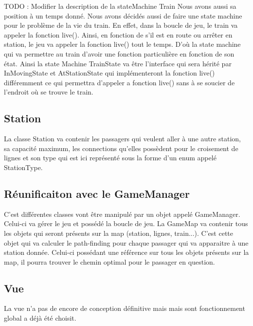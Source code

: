 \documentclass[report, backcover, french, nodocumentinfo]{upmethodology-document}
\begin{document}
			TODO : Modifier la description de la stateMachine Train
			Nous avons aussi sa position à un temps donné. Nous avons décidés aussi de faire une state machine pour le problème de la vie du train. En effet, dans la boucle de jeu, le train va appeler la fonction live(). Ainsi, en fonction de s'il est en route ou arrêter en station, le jeu va appeler la fonction live() tout le temps. D'où la state machine qui va permettre au train d'avoir une fonction particulière en fonction de son état. Ainsi la state Machine TrainState va être l'interface qui sera hérité par InMovingState et AtStationState qui implémenteront la fonction live() différemment ce qui permettra d'appeler a fonction live() sans à se soucier de l'endroit où se trouve le train.
			\subsection{Station}
			La classe Station va contenir les passagers qui veulent aller à une autre station, sa capacité maximum, les connections qu'elles possèdent pour le croisement de lignes et son type qui est ici représenté sous la forme d'un enum appelé StationType.
			\subsection{Réunificaiton avec le GameManager}
			C'est différentes classes vont être manipulé par un objet appelé GameManager. Celui-ci va gérer le jeu et possédé la boucle de jeu. La GameMap va contenir tous les objets qui seront présents sur la map (station, lignes, train...). C'est cette objet qui va calculer le path-finding pour chaque passager qui va apparaitre à une station donnée. Celui-ci possédant une référence sur tous les objets présents sur la map, il pourra trouver le chemin optimal pour le passager en question.
		\subsection{Vue}
			La vue n'a pas de encore de conception définitive mais mais sont fonctionnement global a déjà été choisit.
\end{document}
